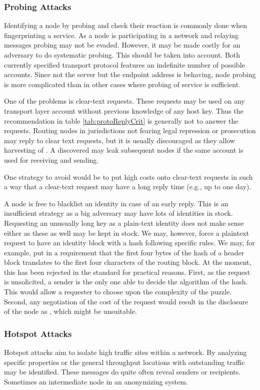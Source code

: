 \subsubsection{Probing Attacks}
Identifying a node by probing and check their reaction is commonly done when fingerprinting a service. As a node is participating in a network and relaying messages probing may not be evaded. However, it may be made costly for an adversary to do systematic probing. This should be taken into account. Both currently specified transport protocol features an indefinite number of possible accounts. Since not the server but the endpoint address is behaving, node probing is more complicated than in other cases where probing of service is sufficient. 

One of the problems is clear-text requests. These requests may be used on any transport layer account without previous knowledge of any host key. Thus the recommendation in table \ref{tab:protoReplyCrit} is generally not to answer the requests. Routing nodes in jurisdictions not fearing legal repression or prosecution may reply to clear text requests, but it is usually discouraged as they allow harvesting of \VortexNodes{}. A discovered \VortexNode{} may leak subsequent nodes if the same account is used for receiving and sending.

One strategy to avoid would be to put high costs onto clear-text requests in such a way that a clear-text request may have a long reply time (e.g., up to one day). 

A node is free to blacklist an identity in case of an early reply. This is an insufficient strategy as a big adversary may have lots of identities in stock. Requesting an unusually long key as a plain-text identity does not make sense either as these as well may be kept in stock. We may, however, force a plaintext request to have an identity block with a hash following specific rules. We may, for example, put in a requirement that the first four bytes of the hash of a header block translates to the first four characters of the routing block. At the moment, this has been rejected in the standard for practical reasons. First, as the request is unsolicited, a sender is the only one able to decide the algorithm of the hash. This would allow a requester to choose upon the complexity of the puzzle. Second, any negotiation of the cost of the request would result in the disclosure of the node as \VortexNode, which might be unsuitable.

\subsubsection{Hotspot Attacks}
Hotspot attacks aim to isolate high traffic sites within a network. By analyzing specific properties or the general throughput locations with outstanding traffic may be identified. These messages do quite often reveal senders or recipients. Sometimes an intermediate node in an anonymizing system. 

